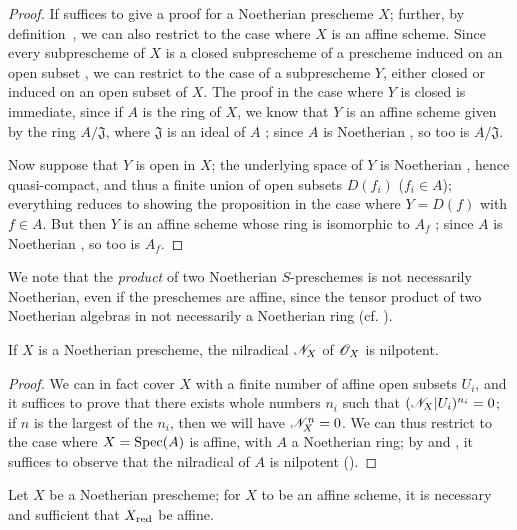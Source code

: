 \begin{proof}
If suffices to give a proof for a Noetherian prescheme $X$;
further, by definition~, we can also restrict to the case where $X$ is an affine scheme.
Since every subprescheme of $X$ is a closed subprescheme of a prescheme induced on an open subset , we can restrict to the case of a subprescheme $Y$, either closed or induced on an open subset of $X$.
The proof in the case where $Y$ is closed is immediate, since if $A$ is the ring of $X$, we know that $Y$ is an affine scheme given by the ring $A/\mathfrak{J}$, where $\mathfrak{J}$ is an ideal of $A$ ;
since $A$ is Noetherian , so too is $A/\mathfrak{J}$.

Now suppose that $Y$ is open in $X$;
the underlying space of $Y$ is Noetherian , hence quasi-compact, and thus a finite union of open subsets $D(f_i)$ ($f_i\in A$);
everything reduces to showing the proposition in the case where $Y=D(f)$ with $f\in A$.
But then $Y$ is an affine scheme whose ring is isomorphic to $A_f$ ;
since $A$ is Noetherian , so too is $A_f$.
\end{proof}

\begin{env}[6.1.5]
\label{I.6.1.5}
We note that the \emph{product} of two Noetherian $S$-preschemes is not necessarily Noetherian, even if the preschemes are affine, since the tensor product of two Noetherian algebras in not necessarily a Noetherian ring (cf. ).
\end{env}

\begin{proposition}[6.1.6]
\label{I.6.1.6}
If $X$ is a Noetherian prescheme, the nilradical $\mathscr{N}_X$ of $\mathscr{O}_X$ is nilpotent.
\end{proposition}

\begin{proof}
We can in fact cover $X$ with a finite number of affine open subsets $U_i$, and it suffices to prove that there exists whole numbers $n_i$ such that $(\mathscr{N}_X|U_i)^{n_i}=0$;
if $n$ is the largest of the $n_i$, then we will have $\mathscr{N}_X^n=0$.
We can thus restrict to the case where $X=\operatorname{Spec}(A)$ is affine, with $A$ a Noetherian ring;
by  and , it suffices to observe that the nilradical of $A$ is nilpotent (\cite[p.~127, cor.~4]{I-11}).
\end{proof}

\begin{corollary}[6.1.7]
\label{I.6.1.7}
Let $X$ be a Noetherian prescheme;
for $X$ to be an affine scheme, it is necessary and sufficient that $X_{\mathrm{red}}$ be affine.
\end{corollary}

